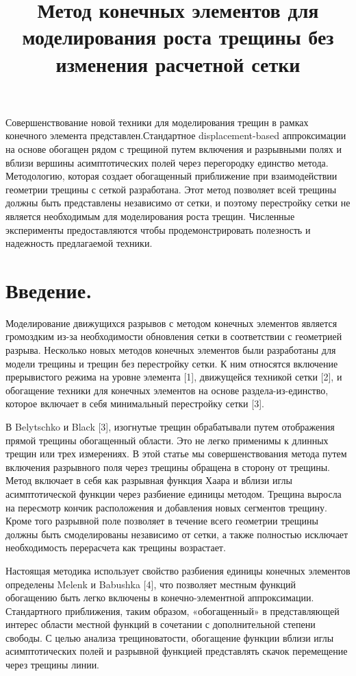 \documentclass[a4paper,12pt]{article}
\begin{document}
\title{Метод конечных элементов для моделирования роста трещины без изменения расчетной сетки}

\maketitle

Совершенствование новой техники для моделирования трещин в рамках
конечного элемента представлен.Стандартное displacement-based аппроксимации
на основе обогащен рядом с трещиной путем включения и разрывными полях и
вблизи вершины асимптотических полей через перегородку единство метода. 
Методологию, которая создает обогащенный приближение при взаимодействии
геометрии трещины с сеткой разработана. Этот метод позволяет всей трещины
должны быть представлены независимо от сетки, и поэтому перестройку сетки
не является необходимым для моделирования роста трещин. Численные эксперименты
предоставляются чтобы продемонстрировать полезность и надежность предлагаемой
техники.


\section{Введение.}

Моделирование движущихся разрывов с методом конечных элементов является
громоздким из-за необходимости обновления сетки в соответствии с геометрией разрыва.
Несколько новых методов конечных элементов были разработаны для модели трещины и
трещин без перестройку сетки. К ним относятся включение прерывистого режима на
уровне элемента [1], движущейся техникой сетки [2], и обогащение техники для
конечных элементов на основе раздела-из-единство, которое включает в себя
минимальный перестройку сетки [3].

В Belytschko и Black [3], изогнутые трещин обрабатывали путем отображения
прямой трещины обогащенный области. Это не легко применимы к длинных трещин
или трех измерениях. В этой статье мы совершенствования метода путем включения
разрывного поля через трещины обращена в сторону от трещины. Метод включает в
себя как разрывная функция Хаара и вблизи иглы асимптотической функции через
разбиение единицы методом. Трещина выросла на пересмотр кончик расположения и
добавления новых сегментов трещину. Кроме того разрывной поле позволяет в течение
всего геометрии трещины должны быть смоделированы независимо от сетки, а также
полностью исключает необходимость перерасчета как трещины возрастает.

Настоящая методика использует свойство разбиения единицы конечных элементов
определены Melenk и Babushka [4], что позволяет местным функций обогащению быть
легко включены в конечно-элементной аппроксимации. Стандартного приближения,
таким образом, «обогащенный» в представляющей интерес области местной функций в
сочетании с дополнительной степени свободы. С целью анализа трещиноватости,
обогащение функции вблизи иглы асимптотических полей и разрывной функцией
представлять скачок перемещение через трещины линии.
\end{document}
